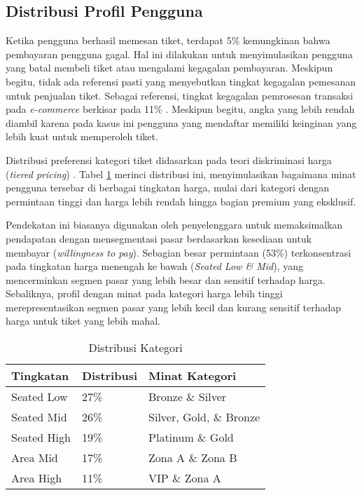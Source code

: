 \subsection{Distribusi Profil Pengguna}

Ketika pengguna berhasil memesan tiket, terdapat 5\% kemungkinan bahwa pembayaran pengguna gagal. Hal ini dilakukan untuk menyimulasikan pengguna yang batal membeli tiket atau mengalami kegagalan pembayaran. Meskipun begitu, tidak ada referensi pasti yang menyebutkan tingkat kegagalan pemesanan untuk penjualan tiket. Sebagai referensi, tingkat kegagalan pemrosesan transaksi pada \textit{e-commerce} berkisar pada 11\% \parencite{paymentFail}. Meskipun begitu, angka yang lebih rendah diambil karena pada kasus ini pengguna yang mendaftar memiliki keinginan yang lebih kuat untuk memperoleh tiket.

Distribusi preferensi kategori tiket didasarkan pada teori diskriminasi harga (\textit{tiered pricing}) \parencite{acei2022}. Tabel \ref{table:distribusi-kategori} merinci distribusi ini, menyimulasikan bagaimana minat pengguna tersebar di berbagai tingkatan harga, mulai dari kategori dengan permintaan tinggi dan harga lebih rendah hingga bagian premium yang eksklusif.

Pendekatan ini biasanya digunakan oleh penyelenggara untuk memaksimalkan pendapatan dengan mensegmentasi pasar berdasarkan kesediaan untuk membayar (\textit{willingness to pay}). Sebagian besar permintaan (53\%) terkonsentrasi pada tingkatan harga menengah ke bawah (\textit{Seated Low \& Mid}), yang mencerminkan segmen pasar yang lebih besar dan sensitif terhadap harga. Sebaliknya, profil dengan minat pada kategori harga lebih tinggi merepresentasikan segmen pasar yang lebih kecil dan kurang sensitif terhadap harga untuk tiket yang lebih mahal.

\begin{table}[H]
    \centering
    \caption{Distribusi Kategori}
    \label{table:distribusi-kategori}
    \begin{tabular}{|l|l|l|}
        \hline
        \textbf{Tingkatan} & \textbf{Distribusi} & \textbf{Minat Kategori} \\
        \hline
        Seated Low         & 27\%                & Bronze \& Silver        \\
        \hline
        Seated Mid         & 26\%                & Silver, Gold, \& Bronze \\
        \hline
        Seated High        & 19\%                & Platinum \& Gold        \\
        \hline
        Area Mid           & 17\%                & Zona A \& Zona B        \\
        \hline
        Area High          & 11\%                & VIP \& Zona A           \\
        \hline
    \end{tabular}
\end{table}

